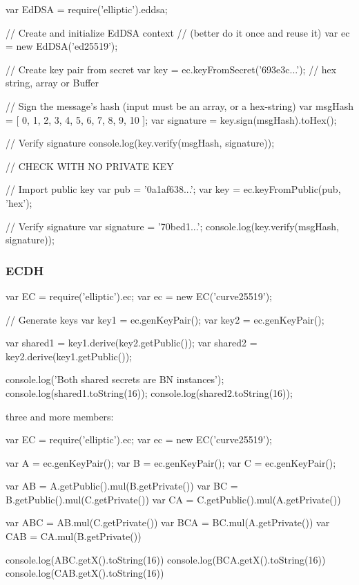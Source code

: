 \begin{DoxyCode}
var EdDSA = require('elliptic').eddsa;

// Create and initialize EdDSA context
// (better do it once and reuse it)
var ec = new EdDSA('ed25519');

// Create key pair from secret
var key = ec.keyFromSecret('693e3c...'); // hex string, array or Buffer

// Sign the message's hash (input must be an array, or a hex-string)
var msgHash = [ 0, 1, 2, 3, 4, 5, 6, 7, 8, 9, 10 ];
var signature = key.sign(msgHash).toHex();

// Verify signature
console.log(key.verify(msgHash, signature));

// CHECK WITH NO PRIVATE KEY

// Import public key
var pub = '0a1af638...';
var key = ec.keyFromPublic(pub, 'hex');

// Verify signature
var signature = '70bed1...';
console.log(key.verify(msgHash, signature));
\end{DoxyCode}


\subsubsection*{E\+C\+DH}


\begin{DoxyCode}
var EC = require('elliptic').ec;
var ec = new EC('curve25519');

// Generate keys
var key1 = ec.genKeyPair();
var key2 = ec.genKeyPair();

var shared1 = key1.derive(key2.getPublic());
var shared2 = key2.derive(key1.getPublic());

console.log('Both shared secrets are BN instances');
console.log(shared1.toString(16));
console.log(shared2.toString(16));
\end{DoxyCode}


three and more members\+: 
\begin{DoxyCode}
var EC = require('elliptic').ec;
var ec = new EC('curve25519');

var A = ec.genKeyPair();
var B = ec.genKeyPair();
var C = ec.genKeyPair();

var AB = A.getPublic().mul(B.getPrivate())
var BC = B.getPublic().mul(C.getPrivate())
var CA = C.getPublic().mul(A.getPrivate())

var ABC = AB.mul(C.getPrivate())
var BCA = BC.mul(A.getPrivate())
var CAB = CA.mul(B.getPrivate())

console.log(ABC.getX().toString(16))
console.log(BCA.getX().toString(16))
console.log(CAB.getX().toString(16))
\end{DoxyCode}


